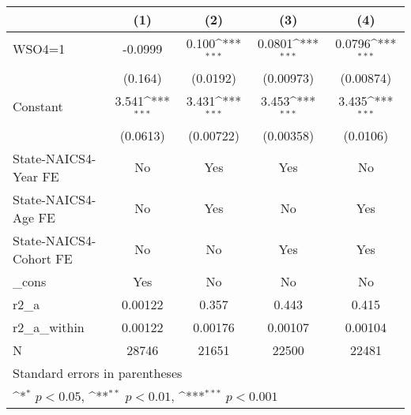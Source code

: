{
\def\sym#1{\ifmmode^{#1}\else\(^{#1}\)\fi}
\begin{tabular}{l*{4}{c}}
\hline\hline
                    &\multicolumn{1}{c}{(1)}         &\multicolumn{1}{c}{(2)}         &\multicolumn{1}{c}{(3)}         &\multicolumn{1}{c}{(4)}         \\
\hline
WSO4=1              &     -0.0999         &       0.100\sym{***}&      0.0801\sym{***}&      0.0796\sym{***}\\
                    &     (0.164)         &    (0.0192)         &   (0.00973)         &   (0.00874)         \\
[1em]
Constant            &       3.541\sym{***}&       3.431\sym{***}&       3.453\sym{***}&       3.435\sym{***}\\
                    &    (0.0613)         &   (0.00722)         &   (0.00358)         &    (0.0106)         \\
[1em]
State-NAICS4-Year FE&          No         &         Yes         &         Yes         &          No         \\
[1em]
State-NAICS4-Age FE &          No         &         Yes         &          No         &         Yes         \\
[1em]
State-NAICS4-Cohort FE&          No         &          No         &         Yes         &         Yes         \\
[1em]
\_cons              &         Yes         &          No         &          No         &          No         \\
\hline
r2\_a                &     0.00122         &       0.357         &       0.443         &       0.415         \\
r2\_a\_within         &     0.00122         &     0.00176         &     0.00107         &     0.00104         \\
N                   &       28746         &       21651         &       22500         &       22481         \\
\hline\hline
\multicolumn{5}{l}{\footnotesize Standard errors in parentheses}\\
\multicolumn{5}{l}{\footnotesize \sym{*} \(p<0.05\), \sym{**} \(p<0.01\), \sym{***} \(p<0.001\)}\\
\end{tabular}
}
